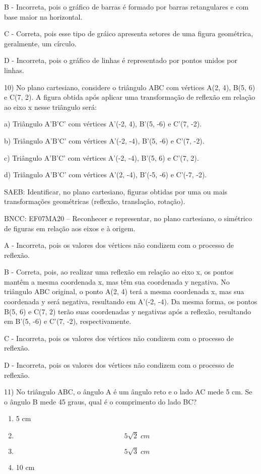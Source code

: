 B - Incorreta, pois o gráfico de barras é formado por barras
retangulares e com base maior na horizontal.

C - Correta, pois esse tipo de gráico apresenta setores de uma figura
geométrica, geralmente, um círculo.

D - Incorreta, pois o gráfico de linhas é representado por pontos unidos
por linhas.

10) No plano cartesiano, considere o triângulo ABC com vértices A(2, 4),
B(5, 6) e C(7, 2). A figura obtida após aplicar uma transformação de
reflexão em relação ao eixo x nesse triângulo será:

a) Triângulo A'B'C' com vértices A'(-2, 4), B'(5, -6) e C'(7, -2).

b) Triângulo A'B'C' com vértices A'(-2, -4), B'(5, -6) e C'(7, -2).

c) Triângulo A'B'C' com vértices A'(-2, -4), B'(5, 6) e C'(7, 2).

d) Triângulo A'B'C' com vértices A'(2, -4), B'(-5, -6) e C'(-7, -2).

SAEB: Identificar, no plano cartesiano, figuras obtidas por uma ou mais
transformações geométricas (reflexão, translação, rotação).

BNCC: EF07MA20 -- Reconhecer e representar, no plano cartesiano, o
simétrico de figuras em relação aos eixos e à origem.

A - Incorreta, pois os valores dos vértices não condizem com o processo
de reflexão.

B - Correta, pois, ao realizar uma reflexão em relação ao eixo x, os
pontos mantêm a mesma coordenada x, mas têm sua coordenada y negativa.
No triângulo ABC original, o ponto A(2, 4) terá a mesma coordenada x,
mas sua coordenada y será negativa, resultando em A'(-2, -4). Da mesma
forma, os pontos B(5, 6) e C(7, 2) terão suas coordenadas y negativas
após a reflexão, resultando em B'(5, -6) e C'(7, -2), respectivamente.

C - Incorreta, pois os valores dos vértices não condizem com o processo
de reflexão.

D - Incorreta, pois os valores dos vértices não condizem com o processo
de reflexão.

11) No triângulo ABC, o ângulo A é um ângulo reto e o lado AC mede 5 cm.
Se o ângulo B mede 45 graus, qual é o comprimento do lado BC?

\begin{enumerate}
\def\labelenumi{\Alph{enumi})}
\item
  5 cm
\item
  \[5 \sqrt 2 \; cm\]
\item
  \[5 \sqrt 3\;cm\]
\item
  10 cm
\end{enumerate}

